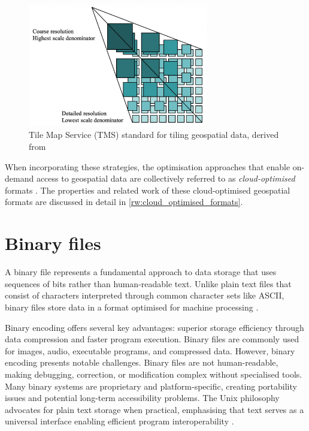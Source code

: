 \begin{figure}[ht]
  \centering
  \includegraphics[width=0.7\textwidth]{figs/related_work_theoretical_bg/tms.png}
  \caption{Tile Map Service (TMS) standard for tiling geospatial data, derived from \citet{tms}}
  \label{fig:tms}
\end{figure}

When incorporating these strategies, the optimisation approaches that enable on-demand access to geospatial data are collectively referred to as \emph{cloud-optimised} formats \citep{cloud-optimised-formats}. The properties and related work of these cloud-optimised geospatial formats are discussed in detail in \autoref{rw:cloud_optimised_formats}.

\section{Binary files}
\label{tb:binary_files}
A binary file represents a fundamental approach to data storage that uses sequences of bits rather than human-readable text. Unlike plain text files that consist of characters interpreted through common character sets like ASCII, binary files store data in a format optimised for machine processing \citep{binary_file}.

Binary encoding offers several key advantages: superior storage efficiency through data compression and faster program execution. Binary files are commonly used for images, audio, executable programs, and compressed data.
However, binary encoding presents notable challenges. Binary files are not human-readable, making debugging, correction, or modification complex without specialised tools. Many binary systems are proprietary and platform-specific, creating portability issues and potential long-term accessibility problems. The Unix philosophy advocates for plain text storage when practical, emphasising that text serves as a universal interface enabling efficient program interoperability \citep{binary_file}.


